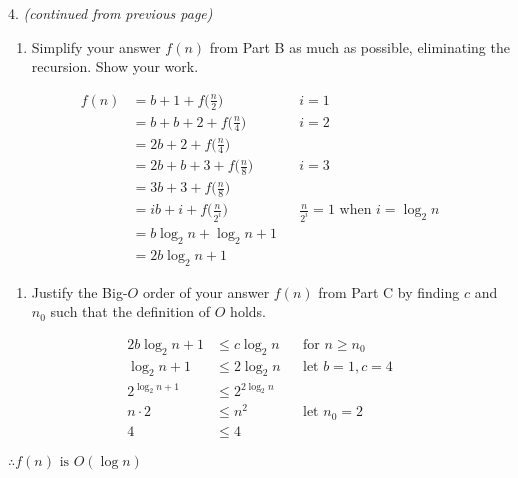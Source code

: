 \documentclass[12pt]{article}
\begin{document}
\newpage
\begin{flushleft}
4. \textit{(continued from previous page)}
\end{flushleft}
\begin{enumerate}[label=C.]
\item Simplify your answer $f(n)$ from Part B as much as possible, eliminating the recursion. Show your work.
\end{enumerate}
\begin{align*}
f(n)&=b+1+f\Big(\frac{n}{2}\Big) &&i=1\\
&=b+b+2+f\Big(\frac{n}{4}\Big)  &&i=2\\
&=2b+2+f\Big(\frac{n}{4}\Big)\\
&=2b+b+3+f\Big(\frac{n}{8}\Big)  &&i=3\\
&=3b+3+f\Big(\frac{n}{8}\Big)\\
&=ib+i+f\Big(\frac{n}{2^i}\Big) &&\frac{n}{2^i}=1 \text{ when } i=\log_{2}n\\
&=b\log_{2}n+\log_{2}n+1\\
&=2b\log_{2}n + 1
\end{align*}
\begin{enumerate}[label=D.]
\item Justify the Big-$O$ order of your answer $f(n)$ from Part C by finding $c$ and $n_{0}$ such that the definition of $O$ holds.
\end{enumerate}
\begin{align*}
2b\log_{2}n+1 &\leq c \log_{2}n &&\text{for } n\geq n_{0}\\
\log_{2}n+1 &\leq 2 \log_{2}n &&\text{let } b=1,c=4\\
2^{\log_{2}n+1} &\leq 2^{2 \log_{2}n}\\
n\cdot 2 &\leq n^2 &&\text{let } n_{0}=2\\
4 &\leq 4
\end{align*}
\begin{center}
$\therefore f(n) \text{ is } O(\log n)$
\end{center}

\newpage
\end{document}
